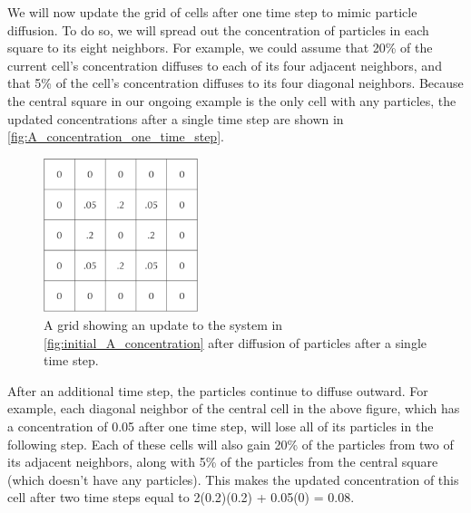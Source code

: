 We will now update the grid of cells after one time step to mimic particle diffusion. To do so, we will spread out the concentration of particles in each square to its eight neighbors. For example, we could assume that 20\% of the current cell's concentration diffuses to each of its four adjacent neighbors, and that 5\% of the cell's concentration diffuses to its four diagonal neighbors. Because the central square in our ongoing example is the only cell with any particles, the updated concentrations after a single time step are shown in \autoref{fig:A_concentration_one_time_step}.\\

\begin{figure}[h]
\centering
\mySfFamily
\includegraphics[width = 0.4\textwidth]{../images/A_concentration_one_time_step.png}
\caption{A grid showing an update to the system in \autoref{fig:initial_A_concentration} after diffusion of particles after a single time step.}
\label{fig:A_concentration_one_time_step}
\end{figure}

\begin{note}\end{note}

After an additional time step, the particles continue to diffuse outward. For example, each diagonal neighbor of the central cell in the above figure, which has a concentration of 0.05 after one time step, will lose all of its particles in the following step. Each of these cells will also gain 20\% of the particles from two of its adjacent neighbors, along with 5\% of the particles from the central square (which doesn't have any particles). This makes the updated concentration of this cell after two time steps equal to 2(0.2)(0.2) + 0.05(0) = 0.08.

